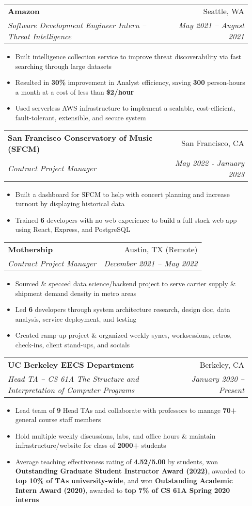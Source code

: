 \documentclass[letterpaper,11pt]{article}
\makeatletter
\newcommand{\resumeItem}[1]{
  \item\small{
    {#1 \vspace{-4pt}}
  }
}
\newcommand{\resumeSubheading}[4]{
  \vspace{-2pt}\item
    \begin{tabular*}{0.97\textwidth}[t]{l@{\extracolsep{\fill}}r}
      \textbf{#1} & #2 \\
      \textit{\small#3} & \textit{\small #4} \\
    \end{tabular*}\vspace{-8pt}
}
\newcommand{\resumeItemListStart}{\begin{itemize}[leftmargin=0.2in]}
\newcommand{\resumeItemListEnd}{\end{itemize}\vspace{-5pt}}
\makeatother
\begin{document}
\resumeSubheading
    {Amazon}{Seattle, WA}{Software Development Engineer Intern – Threat Intelligence}{May 2021 – August 2021}
    \resumeItemListStart
        \resumeItem{Built intelligence collection service to improve threat discoverability via fast searching through large datasets}
        \resumeItem{Resulted in \textbf{30\%} improvement in Analyst efficiency, saving \textbf{300} person-hours a month at a cost of less than \textbf{\$2/hour}}
        \resumeItem{Used serverless AWS infrastructure to implement a scalable, cost-efficient, fault-tolerant, extensible, and secure system}
    \resumeItemListEnd

\resumeSubheading
    {San Francisco Conservatory of Music {\normalfont (SFCM)}}{San Francisco, CA}{Contract Project Manager}{May 2022 - January 2023}
    \resumeItemListStart
        \resumeItem{Built a dashboard for SFCM to help with concert planning and increase turnout by displaying historical data}
        \resumeItem{Trained \textbf{6} developers with no web experience to build a full-stack web app using React, Express, and PostgreSQL}
    \resumeItemListEnd

\resumeSubheading
    {Mothership}{Austin, TX (Remote)}{Contract Project Manager}{December 2021 – May 2022}
    \resumeItemListStart
        \resumeItem{Sourced \& specced data science/backend project to serve carrier supply \& shipment demand density in metro areas}
        \resumeItem{Led \textbf{6} developers through system architecture research, design doc, data analysis, service deployment, and testing}
        \resumeItem{Created ramp-up project \& organized weekly syncs, worksessions, retros, check-ins, client stand-ups, and socials}
    \resumeItemListEnd

\resumeSubheading
    {UC Berkeley EECS Department}{Berkeley, CA}{Head TA – CS 61A The Structure and Interpretation of Computer Programs}{January 2020 – Present}
    \resumeItemListStart
        \resumeItem{Lead team of \textbf{9} Head TAs and collaborate with professors to manage \textbf{70+} general course staff members}
        \resumeItem{Hold multiple weekly discussions, labs, and office hours \& maintain infrastructure/website for class of \textbf{2000+} students}
        \resumeItem{Average teaching effectiveness rating of \textbf{4.52/5.00} by students, won \textbf{Outstanding Graduate Student Instructor Award (2022)}, awarded to \textbf{top 10\% of TAs university-wide}, and won \textbf{Outstanding Academic Intern Award (2020)}, awarded to \textbf{top 7\% of CS 61A Spring 2020 interns}}
    \resumeItemListEnd
\end{document}
